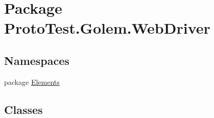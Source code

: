 \hypertarget{namespace_proto_test_1_1_golem_1_1_web_driver}{\section{Package Proto\-Test.\-Golem.\-Web\-Driver}
\label{namespace_proto_test_1_1_golem_1_1_web_driver}
}
\subsection*{Namespaces}
\begin{DoxyCompactItemize}
\item 
package \hyperlink{namespace_proto_test_1_1_golem_1_1_web_driver_1_1_elements}{Elements}
\end{DoxyCompactItemize}
\subsection*{Classes}
